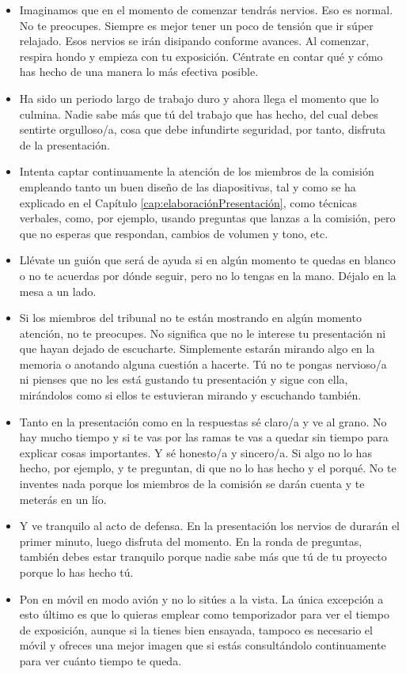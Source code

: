 \begin{itemize}
    \item Imaginamos que en el momento de comenzar tendrás nervios. Eso es normal. No te preocupes. Siempre es mejor tener un poco de tensión que ir súper relajado. Esos nervios se irán disipando conforme avances. Al comenzar, respira hondo y empieza con tu exposición. Céntrate en contar qué y cómo has hecho de una manera lo más efectiva posible.

    \item Ha sido un periodo largo de trabajo duro y ahora llega el momento que lo culmina. Nadie sabe más que tú del trabajo que has hecho, del cual debes sentirte orgulloso/a, cosa que debe infundirte seguridad, por tanto, disfruta de la presentación. 

    \item Intenta captar continuamente la atención de los miembros de la comisión empleando tanto un buen diseño de las diapositivas, tal y como se ha explicado en el Capítulo \ref{cap:elaboraciónPresentación}, como técnicas verbales, como, por ejemplo, usando preguntas que lanzas a la comisión, pero que no esperas que respondan, cambios de volumen y tono, etc.

    \item Llévate un guión que será de ayuda si en algún momento te quedas en blanco o no te acuerdas por dónde seguir, pero no lo tengas en la mano. Déjalo en la mesa a un lado.

    \item Si los miembros del tribunal no te están mostrando en algún momento atención, no te preocupes. No significa que no le interese tu presentación ni que hayan dejado de escucharte. Simplemente estarán mirando algo en la memoria o anotando alguna cuestión a hacerte. Tú no te pongas nervioso/a ni pienses que no les está gustando tu presentación y sigue con ella, mirándolos como si ellos te estuvieran mirando y escuchando también.

    \item Tanto en la presentación como en la respuestas sé claro/a y ve al grano. No hay mucho tiempo y si te vas por las ramas te vas a quedar sin tiempo para explicar cosas importantes. Y sé honesto/a y sincero/a. Si algo no lo has hecho, por ejemplo, y te preguntan, di que no lo has hecho y el porqué. No te inventes nada porque los miembros de la comisión se darán cuenta y te meterás en un lío. 

    \item Y ve tranquilo al acto de defensa. En la presentación los nervios de durarán el primer minuto, luego disfruta del momento. En la ronda de preguntas, también debes estar tranquilo porque nadie sabe más que tú de tu proyecto porque lo has hecho tú.

    \item Pon en móvil en modo avión y no lo sitúes a la vista. La única excepción a esto último es que lo quieras emplear como temporizador para ver el tiempo de exposición, aunque si la tienes bien ensayada, tampoco es necesario el móvil y ofreces una mejor imagen que si estás consultándolo continuamente para ver cuánto tiempo te queda.
\end{itemize}

